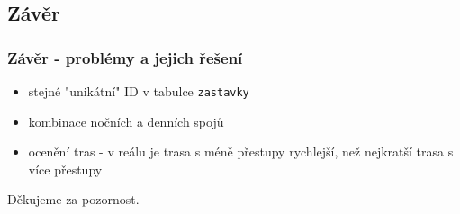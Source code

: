 \documentclass{beamer}
\begin{document}
\begin{frame}
\section{Závěr}
%
%
%
\frametitle{Závěr - problémy a jejich řešení}
\begin{itemize}
	\item stejné "unikátní" ID v tabulce \texttt{zastavky}
	\item kombinace nočních a denních spojů
	\item ocenění tras - v reálu je trasa s méně přestupy rychlejší, než nejkratší trasa s více přestupy
\end{itemize}
\end{frame}

\begin{frame}
\Huge{\centerline{Děkujeme za pozornost.}}


\end{frame}
\end{document}
